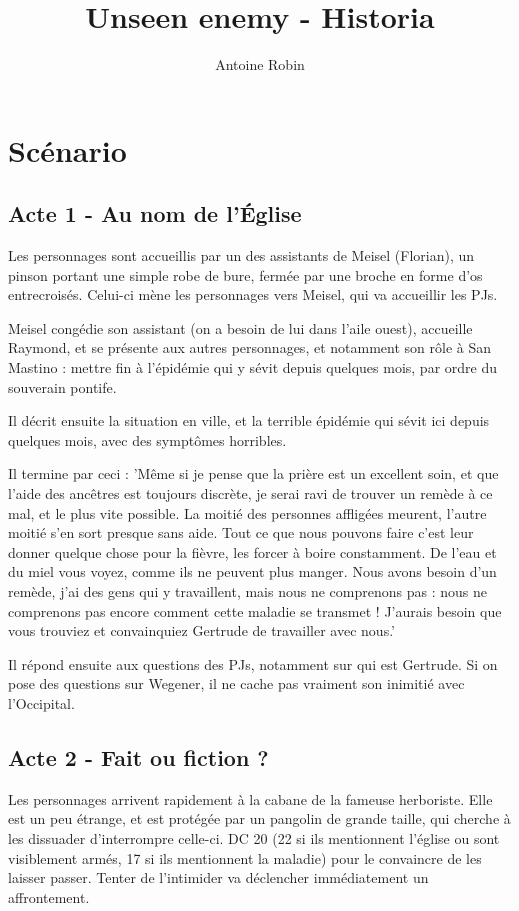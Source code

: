 \documentclass[10pt,a4paper]{article}
\author{ Antoine Robin}
\title{Unseen enemy - Historia}
\begin{document}
\maketitle
\section{Scénario}
\subsection{Acte 1 - Au nom de l'Église}
Les personnages sont accueillis par un des assistants de Meisel (Florian), un pinson portant une simple robe de bure, fermée par une broche en forme d'os entrecroisés. Celui-ci mène les personnages vers Meisel, qui va accueillir les PJs. 

Meisel congédie son assistant (on a besoin de lui dans l'aile ouest), accueille Raymond, et se présente aux autres personnages, et notamment son rôle à San Mastino : mettre fin à l'épidémie qui y sévit depuis quelques mois, par ordre du souverain pontife.

Il décrit ensuite la situation en ville, et la terrible épidémie qui sévit ici depuis quelques mois, avec des symptômes horribles. 

Il termine par ceci : 'Même si je pense que la prière est un excellent soin, et que l'aide des ancêtres est toujours discrète, je serai ravi de trouver un remède à ce mal, et le plus vite possible. La moitié des personnes affligées meurent, l'autre moitié s'en sort presque sans aide. Tout ce que nous pouvons faire c'est leur donner quelque chose pour la fièvre, les forcer à boire constamment. De l'eau et du miel vous voyez, comme ils ne peuvent plus manger. Nous avons besoin d'un remède, j'ai des gens qui y travaillent, mais nous ne comprenons pas : nous ne comprenons pas encore comment cette maladie se transmet ! J'aurais besoin que vous trouviez et convainquiez Gertrude de travailler avec nous.'

Il répond ensuite aux questions des PJs, notamment sur qui est Gertrude. Si on pose des questions sur Wegener, il ne cache pas vraiment son inimitié avec l'Occipital.
\subsection{Acte 2 - Fait ou fiction ?}
Les personnages arrivent rapidement à la cabane de la fameuse herboriste. Elle est un peu étrange, et est protégée par un pangolin de grande taille, qui cherche à les dissuader d'interrompre celle-ci. DC 20 (22 si ils mentionnent l'église ou sont visiblement armés, 17 si ils mentionnent la maladie) pour le convaincre de les laisser passer. Tenter de l'intimider va déclencher immédiatement un affrontement.
\end{document}

